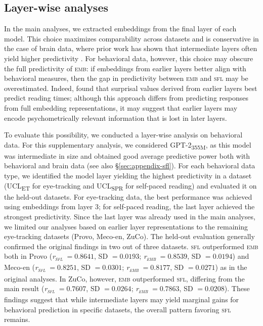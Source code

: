 \documentclass[11pt]{article}
\begin{document}




\subsection{Layer-wise analyses} \label{sec:appendix-layerwise}

In the main analyses, we extracted embeddings from the final layer of each model. This choice maximizes comparability across datasets and is conservative in the case of brain data, where prior work has shown that intermediate layers often yield higher predictivity \citep{caucheteux2022brains, antonello2023scaling}. For behavioral data, however, this choice may obscure the full predictivity of \textsc{emb}: if embeddings from earlier layers better align with behavioral measures, then the gap in predictivity between \textsc{emb} and \textsc{sfl} may be overestimated. Indeed, \citet{kuribayashi2025large} found that surprisal values derived from earlier layers best predict reading times; although this approach differs from predicting responses from full embedding representations, it may suggest that earlier layers may encode psychometrically relevant information that is lost in later layers.

To evaluate this possibility, we conducted a layer-wise analysis on behavioral data. For this supplementary analysis, we considered GPT-2\textsubscript{355M}, as this model was intermediate in size and obtained good average predictive power both with behavioral and brain data (see also §\ref{sec:appendix-sfl}). For each behavioral data type, we identified the model layer yielding the highest predictivity in a dataset (UCL\textsubscript{ET} for eye-tracking and UCL\textsubscript{SPR} for self-paced reading) and evaluated it on the held-out datasets. For eye-tracking data, the best performance was achieved using embeddings from layer 3; for self-paced reading, the last layer achieved the strongest predictivity. Since the last layer was already used in the main analyses, we limited our analyses based on earlier layer representations to the remaining eye-tracking datasets (Provo, Meco-en, ZuCo). The held-out evaluation generally confirmed the original findings in two out of three datasets. \textsc{sfl} outperformed \textsc{emb} both in Provo (\textit{r\textsubscript{\textsc{sfl}}} $= 0.8641$, SD $= 0.0193$; \textit{r\textsubscript{\textsc{emb}}} $= 0.8539$, SD $= 0.0194$) and Meco-en (\textit{r\textsubscript{\textsc{sfl}}} $= 0.8251$, SD $= 0.0301$; \textit{r\textsubscript{\textsc{emb}}} $= 0.8177$, SD $= 0.0271$) as in the original analyses. In ZuCo, however, \textsc{emb} outperformed \textsc{sfl}, differing from the main result (\textit{r\textsubscript{\textsc{sfl}}} $= 0.7607$, SD $= 0.0264$; \textit{r\textsubscript{\textsc{emb}}} $= 0.7863$, SD $= 0.0208$). These findings suggest that while intermediate layers may yield marginal gains for behavioral prediction in specific datasets, the overall pattern favoring \textsc{sfl} remains.
\end{document}
